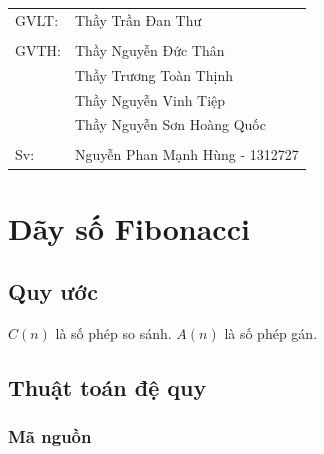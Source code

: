 \documentclass{article}
\begin{document}
\thispagestyle{empty}

\begin{titlepage}


\vfill
\begin{flushright}
\begin{tabular}{l l}
GVLT: &Thầy Trần Đan Thư\\
&\\
GVTH: &Thầy Nguyễn Đức Thân\\
&Thầy Trương Toàn Thịnh\\
&Thầy Nguyễn Vinh Tiệp\\
&Thầy Nguyễn Sơn Hoàng Quốc\\
&\\
Sv: &Nguyễn Phan Mạnh Hùng - 1312727\\
\end{tabular}
\end{flushright}
\end{titlepage}
\pagebreak
\thispagestyle{empty}
\tableofcontents
\pagebreak
\section{Dãy số Fibonacci}
\subsection{Quy ước}
$C(n)$ là số phép so sánh.\newline
$A(n)$ là số phép gán.\newline
\subsection{Thuật toán đệ quy}
\subsubsection{Mã nguồn}

\end{document}
